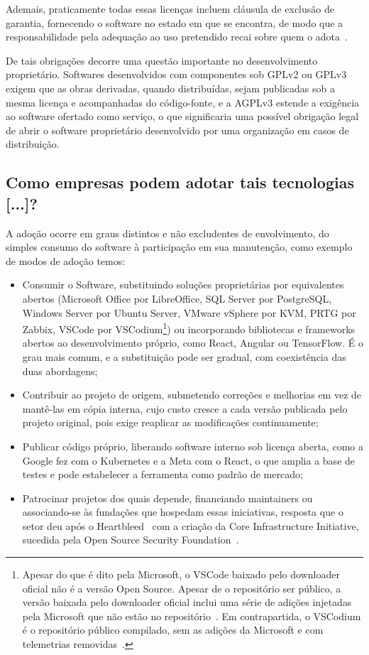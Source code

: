 Ademais, praticamente todas essas licenças incluem cláusula de exclusão de garantia, fornecendo o software no estado em que se encontra, de modo que a responsabilidade pela adequação ao uso pretendido recai sobre quem o adota~\cite{fsf2026licencas}.

De tais obrigações decorre uma questão importante no desenvolvimento proprietário. Softwares desenvolvidos com componentes sob GPLv2 ou GPLv3 exigem que as obras derivadas, quando distribuídas, sejam publicadas sob a mesma licença e acompanhadas do código-fonte, e a AGPLv3 estende a exigência ao software ofertado como serviço, o que significaria uma possível obrigação legal de abrir o software proprietário desenvolvido por uma organização em casos de distribuição.

\subsection{Como empresas podem adotar tais tecnologias [...]?}
\label{q3-2}

A adoção ocorre em graus distintos e não excludentes de envolvimento, do simples consumo do software à participação em sua manutenção, como exemplo de modos de adoção temos:

\begin{itemize}
    \item Consumir o Software, substituindo soluções proprietárias por equivalentes abertos (Microsoft Office por LibreOffice, SQL Server por PostgreSQL, Windows Server por Ubuntu Server, VMware vSphere por KVM, PRTG por Zabbix, VSCode por VSCodium\footnote{Apesar do que é dito pela Microsoft, o VSCode baixado pelo downloader oficial não é a versão Open Source. Apesar de o repositório ser público, a versão baixada pelo downloader oficial inclui uma série de adições injetadas pela Microsoft que não estão no repositório~\cite{vscodeFaq}. Em contrapartida, o VSCodium é o repositório público compilado, sem as adições da Microsoft e com telemetrias removidas~\cite{vscodium}.}) ou incorporando bibliotecas e frameworks abertos ao desenvolvimento próprio, como React, Angular ou TensorFlow. É o grau mais comum, e a substituição pode ser gradual, com coexistência das duas abordagens;
    \item Contribuir ao projeto de origem, submetendo correções e melhorias em vez de mantê-las em cópia interna, cujo custo cresce a cada versão publicada pelo projeto original, pois exige reaplicar as modificações continuamente;
    \item Publicar código próprio, liberando software interno sob licença aberta, como a Google fez com o Kubernetes e a Meta com o React, o que amplia a base de testes e pode estabelecer a ferramenta como padrão de mercado;
    \item Patrocinar projetos dos quais depende, financiando maintainers ou associando-se às fundações que hospedam essas iniciativas, resposta que o setor deu após o Heartbleed~\cite{heartbleed} com a criação da Core Infrastructure Initiative, sucedida pela Open Source Security Foundation~\cite{openssf}.
\end{itemize}

